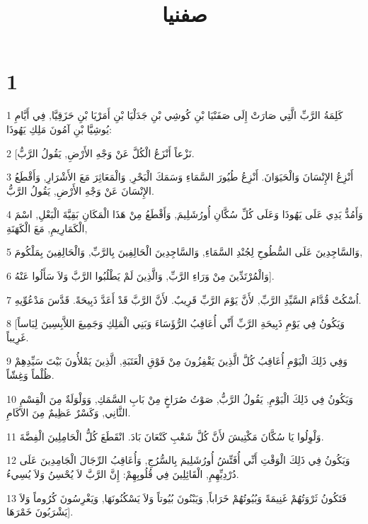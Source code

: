 

\title{صفنيا}


\chapter{1}

\par 1 كَلِمَةُ الرَّبِّ الَّتِي صَارَتْ إِلَى صَفَنْيَا بْنِ كُوشِي بْنِ جَدَلْيَا بْنِ أَمَرْيَا بْنِ حَزَقِيَّا, فِي أَيَّامِ يُوشِيَّا بْنِ آمُونَ مَلِكِ يَهُوذَا:
\par 2 [نَزْعاً أَنْزَعُ الْكُلَّ عَنْ وَجْهِ الأَرْضِ, يَقُولُ الرَّبُّ.
\par 3 أَنْزِعُ الإِنْسَانَ وَالْحَيَوَانَ. أَنْزِعُ طُيُورَ السَّمَاءِ وَسَمَكَ الْبَحْرِ, وَالْمَعَاثِرَ مَعَ الأَشْرَارِ, وَأَقْطَعُ الإِنْسَانَ عَنْ وَجْهِ الأَرْضِ, يَقُولُ الرَّبُّ.
\par 4 وَأَمُدُّ يَدِي عَلَى يَهُوذَا وَعَلَى كُلِّ سُكَّانِ أُورُشَلِيمَ, وَأَقْطَعُ مِنْ هَذَا الْمَكَانِ بَقِيَّةَ الْبَعْلِ, اسْمَ الْكَمَارِيمِ, مَعَ الْكَهَنَةِ,
\par 5 وَالسَّاجِدِينَ عَلَى السُّطُوحِ لِجُنْدِ السَّمَاءِ, وَالسَّاجِدِينَ الْحَالِفِينَ بِالرَّبِّ, وَالْحَالِفِينَ بِمَلْكُومَ,
\par 6 وَالْمُرْتَدِّينَ مِنْ وَرَاءِ الرَّبِّ, وَالَّذِينَ لَمْ يَطْلُبُوا الرَّبَّ وَلاَ سَأَلُوا عَنْهُ].
\par 7 اُسْكُتْ قُدَّامَ السَّيِّدِ الرَّبِّ, لأَنَّ يَوْمَ الرَّبِّ قَرِيبٌ. لأَنَّ الرَّبَّ قَدْ أَعَدَّ ذَبِيحَةً. قَدَّسَ مَدْعُوِّيهِ.
\par 8 [وَيَكُونُ فِي يَوْمِ ذَبِيحَةِ الرَّبِّ أَنِّي أُعَاقِبُ الرُّؤَسَاءَ وَبَنِي الْمَلِكِ وَجَمِيعَ اللاَّبِسِينَ لِبَاساً غَرِيباً.
\par 9 وَفِي ذَلِكَ الْيَوْمِ أُعَاقِبُ كُلَّ الَّذِينَ يَقْفِزُونَ مِنْ فَوْقِ الْعَتَبَةِ, الَّذِينَ يَمْلأُونَ بَيْتَ سَيِّدِهِمْ ظُلْماً وَغِشّاً.
\par 10 وَيَكُونُ فِي ذَلِكَ الْيَوْمِ, يَقُولُ الرَّبُّ, صَوْتُ صُرَاخٍ مِنْ بَابِ السَّمَكِ, وَوَلْوَلَةٌ مِنَ الْقِسْمِ الثَّانِي, وَكَسْرٌ عَظِيمٌ مِنَ الآكَامِ.
\par 11 وَلْوِلُوا يَا سُكَّانَ مَكْتِيشَ لأَنَّ كُلَّ شَعْبِ كَنْعَانَ بَادَ. انْقَطَعَ كُلُّ الْحَامِلِينَ الْفِضَّةَ.
\par 12 وَيَكُونُ فِي ذَلِكَ الْوَقْتِ أَنِّي أُفَتِّشُ أُورُشَلِيمَ بِالسُّرُجِ, وَأُعَاقِبُ الرِّجَالَ الْجَامِدِينَ عَلَى دُرْدِيِّهِمِ, الْقَائِلِينَ فِي قُلُوبِهِمْ: إِنَّ الرَّبَّ لاَ يُحْسِنُ وَلاَ يُسِيءُ.
\par 13 فَتَكُونُ ثَرْوَتُهُمْ غَنِيمَةً وَبُيُوتُهُمْ خَرَاباً, وَيَبْنُونَ بُيُوتاً وَلاَ يَسْكُنُونَهَا, وَيَغْرِسُونَ كُرُوماً وَلاَ يَشْرَبُونَ خَمْرَهَا].
